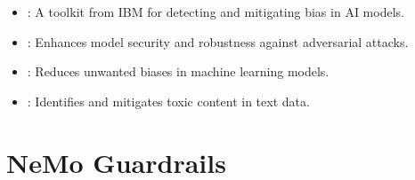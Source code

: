 \documentclass[letterpaper,11pt,english]{sphinxmanual}
\begin{document}
\begin{itemize}
\begin{itemize}
\item {} 
\sphinxAtStartPar
{}: A toolkit from IBM for detecting and
mitigating bias in AI models.

\item {} 
\sphinxAtStartPar
{}: Enhances model security
and robustness against adversarial attacks.

\item {} 
\sphinxAtStartPar
{}: Reduces unwanted biases in machine learning models.

\item {} 
\sphinxAtStartPar
{}: Identifies and mitigates toxic content in text data.

\end{itemize}

\end{itemize}


\section{NeMo Guardrails}
\label{\detokenize{guardrails:nemo-guardrails}}
\end{document}
